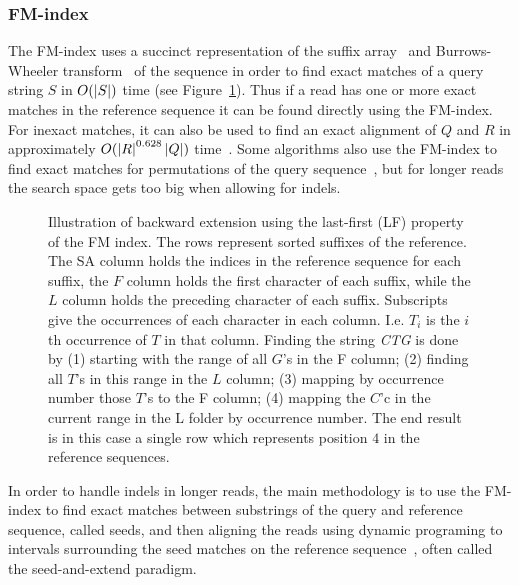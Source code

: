 \subsubsection{FM-index}
The FM-index uses a succinct representation of the suffix array~\cite{suffixarray} and Burrows-Wheeler transform~\cite{BWT} of the sequence in order to find exact matches of a query string $S$ in $O(\left|S\right|)$ time (see Figure~\ref{fig:FM}).
Thus if a read has one or more exact matches in the reference sequence it can be found directly using the FM-index.
For inexact matches, it can also be used to find an exact alignment of $Q$ and $R$ in approximately $O(\left|R\right|^{0.628}\left|Q\right|)$ time~\cite{bwtsw, bwalong}.
Some algorithms also use the FM-index to find exact matches for permutations of the query sequence~\cite{bowtie1, bwashort}, but for longer reads the search space gets too big when allowing for indels.
\begin{figure}
  \tikzpicture
  
  \endtikzpicture
  \label{fig:FM}
  \caption{Illustration of backward extension using the last-first (LF) property of the FM index.
    The rows represent sorted suffixes of the reference. The SA column holds the indices in the reference sequence for each suffix, the $F$ column holds the first character of each suffix, while the $L$ column holds the preceding character of each suffix. Subscripts give the occurrences of each character in each column. I.e. $T_i$ is the $i$th occurrence of $T$ in that column. Finding the string \emph{CTG} is done by (1) starting with the range of all $G$'s in the F column; (2) finding all $T$'s in this range in the $L$ column; (3) mapping by occurrence number those $T$'s to the F column; (4) mapping the $C$'c in the current range in the L folder by occurrence number. The end result is in this case a single row which represents position $4$ in the reference sequences. 
}
\end{figure}

In order to handle indels in longer reads, the main methodology is to use the FM-index to find exact matches between substrings of the query and reference sequence, called seeds, and then aligning the reads using dynamic programing to intervals surrounding the seed matches on the reference sequence~\cite{bowtie2}, often called the seed-and-extend paradigm.

